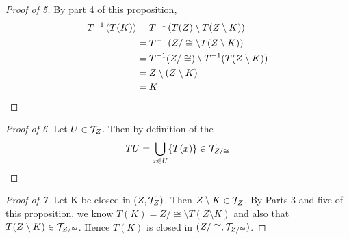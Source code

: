 \begin{prop}
\begin{proof}[Proof of 5]
        By part 4 of this proposition, 
        \begin{align*}
            T^{-1}\left( T(K)\right)&=T^{-1} \left( T(Z) \setminus T(Z \setminus K)\right) \\
            &= T^{-1}\left( Z/\cong \setminus T(Z \setminus K)\right)\\
            &=T^{-1}(Z/\cong) \setminus T^{-1}(T(Z\setminus K)) \\
            &= Z \setminus \left( Z \setminus K\right) \\
            &= K
        \end{align*}      
    \end{proof}
    \begin{proof}[Proof of 6]
        Let $U \in \mathcal{T}_Z$.
        Then by definition of the \QuotientSpaceTopology
        \begin{equation}
            TU= \bigcup_{x \in U} \{T(x)\}  \in \mathcal{T}_{Z/\cong}
        \end{equation}
    \end{proof}  
    \begin{proof}[Proof of 7] 
        Let K be closed in $(Z,\mathcal{T}_Z)$. 
        Then $Z \setminus K \in \mathcal{T}_Z$. 
        By Parts 3 and five of this proposition, we know $T(K) = Z/\cong \setminus T(Z\setminus K)$ and also that $T(Z\setminus K) \in \mathcal{T}_{Z/\cong}$. Hence $T(K)$ is closed in $(Z/\cong, \mathcal{T}_{Z/\cong})$. 
    \end{proof} 
\end{prop} 